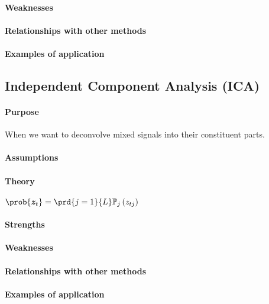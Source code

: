 \paragraph{Weaknesses}
\paragraph{Relationships with other methods}
\paragraph{Examples of application}

\subsection{Independent Component Analysis (ICA)}
\paragraph{Purpose}
When we want to deconvolve mixed signals into their constituent parts.\\

\paragraph{Assumptions}
\paragraph{Theory}
$\prob{\bm{z}_{t}} = \prd{j=1}{L}\mathbb{P}_{j}\left(z_{tj}\right)$
\paragraph{Strengths}
\paragraph{Weaknesses}
\paragraph{Relationships with other methods}
\paragraph{Examples of application}



